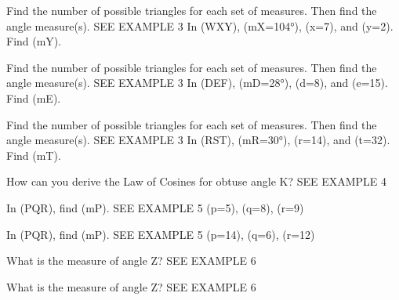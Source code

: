\documentclass{article}
\newenvironment{practice}[2]{}{}        %
\newcommand{\answer}[1]{}               %
\newcommand{\placeholder}[2]{}          %
\begin{document}
\begin{practice}{22}{2}
Find the number of possible triangles for each set of measures. Then find the angle measure(s). SEE EXAMPLE 3
In (\triangle WXY), (m\angle X=104°), (x=7), and (y=2). Find (m\angle Y).
\answer{one: (m\angle Y\approx16.1°)}
\end{practice}
\begin{practice}{23}{2}
Find the number of possible triangles for each set of measures. Then find the angle measure(s). SEE EXAMPLE 3
In (\triangle DEF), (m\angle D=28°), (d=8), and (e=15). Find (m\angle E).
\answer{two: (m\angle E\approx61.7°) or 118.3°}
\end{practice}
\begin{practice}{24}{2}
Find the number of possible triangles for each set of measures. Then find the angle measure(s). SEE EXAMPLE 3
In (\triangle RST), (m\angle R=30°), (r=14), and (t=32). Find (m\angle T).
\answer{zero}
\end{practice}
\begin{practice}{25}{3}
How can you derive the Law of Cosines for obtuse angle K? SEE EXAMPLE 4
\placeholder{diagram}{Black triangle JKL, horizontal top JK, J left K right, L below and right of K; obtuse angle at K.}
\answer{Sample: Student draws altitude outside triangle from vertex L. (\cos(180°-K)=-\cos K=\frac xj); (x=-j\cos K); (x^2+h^2=j^2) and ((l+x)^2+h^2=k^2); (l^2+2lx+x^2+h^2=k^2); (k^2=l^2+2l(-j\cos K)+j^2); (k^2=l^2+j^2-2lj(\cos K)).}
\end{practice}
\begin{practice}{26}{1}
In (\triangle PQR), find (m\angle P). SEE EXAMPLE 5
(p=5), (q=8), (r=9)
\answer{about 33.6°}
\end{practice}
\begin{practice}{27}{1}
In (\triangle PQR), find (m\angle P). SEE EXAMPLE 5
(p=14), (q=6), (r=12)
\answer{about 96.4°}
\end{practice}
\begin{practice}{28}{2}
What is the measure of angle Z? SEE EXAMPLE 6
\placeholder{diagram}{Black triangle XYZ, horizontal base Y left Z right, X above near right. Red XY 54, YZ 42, angle Y 25°.}
\answer{about 106.9°}
\end{practice}
\begin{practice}{29}{2}
What is the measure of angle Z? SEE EXAMPLE 6
\placeholder{diagram}{Black triangle XYZ, X left, Y upper right, Z bottom. Red XY 7.7, YZ 9, angle Y 34°.}
\answer{about 58.7°}
\end{practice}
\end{document}
